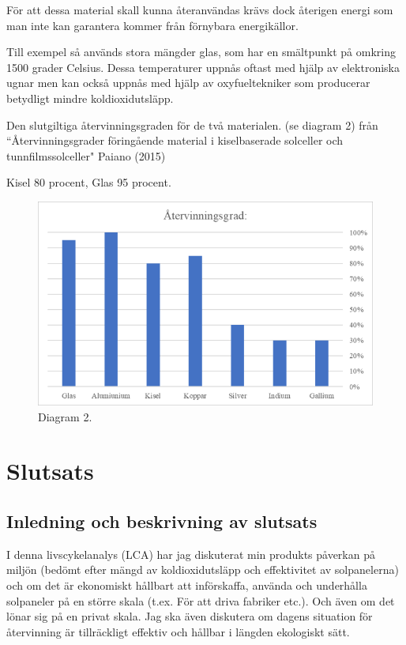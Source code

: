\documentclass{article}
\begin{document}
För att dessa material skall kunna återanvändas krävs dock återigen energi som man inte kan garantera kommer från förnybara energikällor. 

Till exempel så används stora mängder glas, som har en smältpunkt på omkring 1500 grader Celsius. Dessa temperaturer uppnås oftast med hjälp av elektroniska ugnar men kan också uppnås med hjälp av oxyfueltekniker som producerar betydligt mindre koldioxidutsläpp.

Den slutgiltiga återvinningsgraden för de två materialen. (se diagram 2) från “Återvinningsgrader föringående material i kiselbaserade solceller och tunnfilmssolceller" Paiano (2015)

Kisel 80 procent, Glas 95 procent. 

\begin{figure}[h]
	\centering
	\includegraphics[width=\linewidth]{diagram2}
	\caption{Diagram 2.}
	\label{fig:dig2}
\end{figure}
\pagebreak
\section{Slutsats}

\subsection{Inledning och beskrivning av slutsats}

I denna livscykelanalys (LCA) har jag diskuterat min produkts påverkan på miljön (bedömt efter mängd av koldioxidutsläpp och effektivitet av solpanelerna) och om det är ekonomiskt hållbart att införskaffa, använda och underhålla solpaneler på en större skala (t.ex. För att driva fabriker etc.). Och även om det lönar sig på en privat skala. Jag ska även diskutera om dagens situation för återvinning är tillräckligt effektiv och hållbar i längden ekologiskt sätt.
\end{document}
